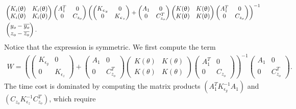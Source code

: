 \documentclass[article,ij4uq]{ij4uq}              %
\begin{document}
\begin{algorithm}[!ht]
\begin{align}
    &\begin{pmatrix}K_{i}(\theta) & K_{i}(\theta)\\K_{i}(\theta) & K_{i}(\theta)\end{pmatrix}\begin{pmatrix}A_{1}^{T} & 0\\0 & C_{z_{o}}\end{pmatrix}\left(\begin{pmatrix}K_{\epsilon_{y}}&0\\0&K_{\epsilon_{z}}\end{pmatrix}+\begin{pmatrix}A_{1}&0\\0&C_{z_{o}}^{T}\end{pmatrix}\begin{pmatrix}K(\theta)&K(\theta)\\K(\theta)&K(\theta)\end{pmatrix}\begin{pmatrix}A_{1}^{T}&0\\0&C_{z_{o}}\end{pmatrix}\right)^{-1}\notag\\
    &\begin{pmatrix}y_{o}-\overline{y_{o}}\\ z_{o}-\overline{z_{o}}\end{pmatrix}.\label{eq52}
\end{align}
Notice that the expression is symmetric. We first compute the term
\begin{align}
    W=\left(\begin{pmatrix}K_{\epsilon_{y}}&0\\0&K_{\epsilon_{z}}\end{pmatrix}+\begin{pmatrix}A_{1}&0\\0&C_{z_{o}}^{T}\end{pmatrix}\begin{pmatrix}K(\theta)&K(\theta)\\K(\theta)&K(\theta)\end{pmatrix}\begin{pmatrix}A_{1}^{T}&0\\0&C_{z_{o}}\end{pmatrix}\right)^{-1}\begin{pmatrix}A_{1} & 0\\0 & C_{z_{o}}^{T}\end{pmatrix}.
\end{align}
The time cost is dominated by computing the matrix products $(A_{1}^{T}K_{\epsilon_{y}}^{-1}A_{1})$ and $(C_{z_{o}}K_{\epsilon_{z}}^{-1}C_{z_{o}}^{T})$, which require

\end{algorithm}
\end{document}
